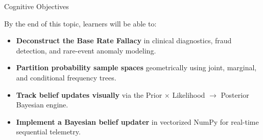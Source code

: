 \documentclass[../m00-session-03.tex]{subfiles}
\begin{document}

\begin{frame}{Cognitive Objectives}
  \begin{LearningObjectives}{By the end of this topic, learners will be able to:}
    \begin{itemize}\setlength{\itemsep}{0.28em}
      \item \textbf{Deconstruct the Base Rate Fallacy} in clinical diagnostics, fraud detection, and rare-event anomaly modeling.
      \item \textbf{Partition probability sample spaces} geometrically using joint, marginal, and conditional frequency trees.
      \item \textbf{Track belief updates visually} via the Prior $\times$ Likelihood $\to$ Posterior Bayesian engine.
      \item \textbf{Implement a Bayesian belief updater} in vectorized NumPy for real-time sequential telemetry.
    \end{itemize}
  \end{LearningObjectives}
\end{frame}
\end{document}
